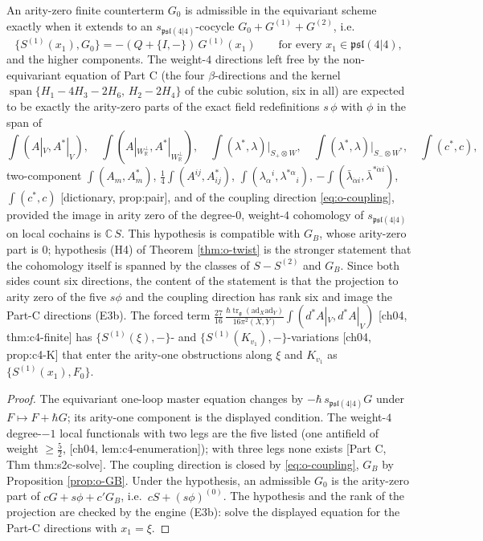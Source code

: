 \begin{proposition}
\label{prop:o-arity0}
An arity-zero finite counterterm $G_0$ is admissible in the equivariant scheme exactly when it extends to an $s_{\mathfrak{psl}(4|4)}$-cocycle $G_0+G^{(1)}+G^{(2)}$, i.e.
\[
\{S^{(1)}(x_1),G_0\}=-(Q+\{I,-\})\,G^{(1)}(x_1)\qquad\text{for every }x_1\in\mathfrak{psl}(4|4),
\]
and the higher components. The weight-$4$ directions left free by the non-equivariant equation of Part C (the four $\beta$-directions and the kernel $\operatorname{span}\{H_1-4H_3-2H_6,\,H_2-2H_4\}$ of the cubic solution, six in all) are expected to be exactly the arity-zero parts of the exact field redefinitions $s\,\phi$ with $\phi$ in the span of
\[
\int(A|_V,A^*|_V),\quad \int(A|_{W_{\mathbb R}^\perp},A^*|_{W_{\mathbb R}^\perp}),\quad \int(\lambda^*,\lambda)\big|_{S_+\otimes W},\quad \int(\lambda^*,\lambda)\big|_{S_-\otimes W^*},\quad \int(c^*,c),
\]
two-component $\int(A_m,A^*_m)$, $\tfrac14\int(A^{ij},A^*_{ij})$, $\int(\lambda_\alpha{}^i,\lambda^{*\alpha}{}_i)$, $-\int(\bar\lambda_{\dot\alpha i},\bar\lambda^{*\dot\alpha i})$, $\int(c^*,c)$ [dictionary, prop:pair], and of the coupling direction \eqref{eq:o-coupling}, provided the image in arity zero of the degree-$0$, weight-$4$ cohomology of $s_{\mathfrak{psl}(4|4)}$ on local cochains is $\mathbb C\,S$. This hypothesis is compatible with $G_B$, whose arity-zero part is $0$; hypothesis (H4) of Theorem \ref{thm:o-twist} is the stronger statement that the cohomology itself is spanned by the classes of $S-S^{(2)}$ and $G_B$. Since both sides count six directions, the content of the statement is that the projection to arity zero of the five $s\phi$ and the coupling direction has rank six and image the Part-C directions (E3b). The forced term $\tfrac{27}{16}\,\frac{\hbar\operatorname{tr}_{\mathfrak g}(\mathrm{ad}_X\mathrm{ad}_Y)}{16\pi^2(X,Y)}\int(d^*A|_V,d^*A|_V)$ [ch04, thm:c4-finite] has $\{S^{(1)}(\xi),-\}$- and $\{S^{(1)}(K_{v_1}),-\}$-variations [ch04, prop:c4-K] that enter the arity-one obstructions along $\xi$ and $K_{v_1}$ as $\{S^{(1)}(x_1),F_0\}$.
\end{proposition}

\begin{proof}
The equivariant one-loop master equation changes by $-\hbar\,s_{\mathfrak{psl}(4|4)}G$ under $F\mapsto F+\hbar G$; its arity-one component is the displayed condition. The weight-$4$ degree-$-1$ local functionals with two legs are the five listed (one antifield of weight $\ge\tfrac52$, [ch04, lem:c4-enumeration]); with three legs none exists [Part C, Thm thm:s2c-solve]. The coupling direction is closed by \eqref{eq:o-coupling}, $G_B$ by Proposition \ref{prop:o-GB}. Under the hypothesis, an admissible $G_0$ is the arity-zero part of $cG+s\phi+c'G_B$, i.e.\ $cS+(s\phi)^{(0)}$. The hypothesis and the rank of the projection are checked by the engine (E3b): solve the displayed equation for the Part-C directions with $x_1=\xi$.
\end{proof}

